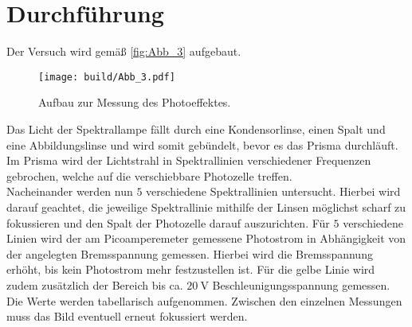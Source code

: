 \section{Durchführung}
\label{sec:Durchführung}

Der Versuch wird gemäß \autoref{fig:Abb_3} aufgebaut.
\begin{figure}[H]
    \centering
    \texttt{[image: build/Abb\_3.pdf]}
    \caption{Aufbau zur Messung des Photoeffektes.\cite{V500}}
    \label{fig:Abb_3}
\end{figure}
Das Licht der Spektrallampe fällt durch eine Kondensorlinse, einen Spalt und eine Abbildungslinse und wird 
somit gebündelt, bevor es das Prisma durchläuft.
Im Prisma wird der Lichtstrahl in Spektrallinien verschiedener Frequenzen gebrochen, welche auf die verschiebbare Photozelle treffen.\\
Nacheinander werden nun $5$ verschiedene Spektrallinien untersucht.
Hierbei wird darauf geachtet, die jeweilige Spektrallinie mithilfe der Linsen möglichst scharf zu fokussieren und den Spalt der
Photozelle darauf auszurichten.
Für $5$ verschiedene Linien wird der am Picoamperemeter gemessene Photostrom in Abhängigkeit von der angelegten Bremsspannung gemessen.
Hierbei wird die Bremsspannung erhöht, bis kein Photostrom mehr festzustellen ist.
Für die gelbe Linie wird zudem zusätzlich der Bereich bis ca. $\qty{20}{\volt}$ Beschleunigungsspannung gemessen.
Die Werte werden tabellarisch aufgenommen.
Zwischen den einzelnen Messungen muss das Bild eventuell erneut fokussiert werden.